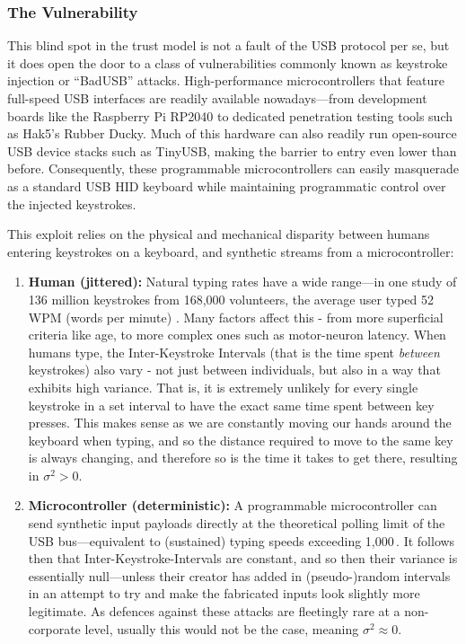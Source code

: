 \subsubsection{The Vulnerability}

This blind spot in the trust model is not a fault of the USB protocol per se, but it does open the door to a class of vulnerabilities commonly known as keystroke injection or ``BadUSB'' attacks. High-performance microcontrollers that feature full-speed USB interfaces are readily available nowadays---from development boards like the Raspberry Pi RP2040 to dedicated penetration testing tools such as Hak5's Rubber Ducky. Much of this hardware can also readily run open-source USB device stacks such as TinyUSB, making the barrier to entry even lower than before. Consequently, these programmable microcontrollers can easily masquerade as a standard USB HID keyboard while maintaining programmatic control over the injected keystrokes.

This exploit relies on the physical and mechanical disparity between humans entering keystrokes on a keyboard, and synthetic streams from a microcontroller:

\begin{enumerate}
	\item \textbf{Human (jittered):} Natural typing rates have a wide range---in one study of 136 million keystrokes from 168,000 volunteers, the average user typed 52 WPM (words per minute) \cite{dhakal2018observations}. Many factors affect this - from more superficial criteria like age, to more complex ones such as motor-neuron latency. When humans type, the Inter-Keystroke Intervals (that is the time spent \textit{between} keystrokes) also vary - not just between individuals, but also in a way that exhibits high variance. That is, it is extremely unlikely for every single keystroke in a set interval to have the exact same time spent between key presses. This makes sense as we are constantly moving our hands around the keyboard when typing, and so the distance required to move to the same key is always changing, and therefore so is the time it takes to get there, resulting in $\sigma^2 > 0$.
	\item \textbf{Microcontroller (deterministic):} A programmable microcontroller can send synthetic input payloads directly at the theoretical polling limit of the USB bus---equivalent to (sustained) typing speeds exceeding 1,000\,. It follows then that Inter-Keystroke-Intervals are constant, and so then their variance is essentially null---unless their creator has added in (pseudo-)random intervals in an attempt to try and make the fabricated inputs look slightly more legitimate. As defences against these attacks are fleetingly rare at a non-corporate level, usually this would not be the case, meaning $\sigma^2 \approx 0$.
\end{enumerate}

